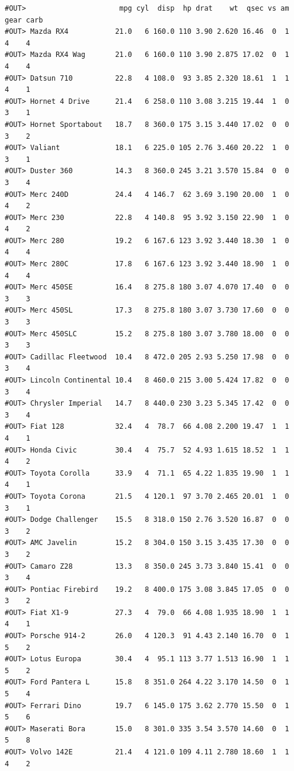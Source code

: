 \documentclass[]{book}
\begin{document}
\begin{verbatim}
#OUT>                      mpg cyl  disp  hp drat    wt  qsec vs am gear carb
#OUT> Mazda RX4           21.0   6 160.0 110 3.90 2.620 16.46  0  1    4    4
#OUT> Mazda RX4 Wag       21.0   6 160.0 110 3.90 2.875 17.02  0  1    4    4
#OUT> Datsun 710          22.8   4 108.0  93 3.85 2.320 18.61  1  1    4    1
#OUT> Hornet 4 Drive      21.4   6 258.0 110 3.08 3.215 19.44  1  0    3    1
#OUT> Hornet Sportabout   18.7   8 360.0 175 3.15 3.440 17.02  0  0    3    2
#OUT> Valiant             18.1   6 225.0 105 2.76 3.460 20.22  1  0    3    1
#OUT> Duster 360          14.3   8 360.0 245 3.21 3.570 15.84  0  0    3    4
#OUT> Merc 240D           24.4   4 146.7  62 3.69 3.190 20.00  1  0    4    2
#OUT> Merc 230            22.8   4 140.8  95 3.92 3.150 22.90  1  0    4    2
#OUT> Merc 280            19.2   6 167.6 123 3.92 3.440 18.30  1  0    4    4
#OUT> Merc 280C           17.8   6 167.6 123 3.92 3.440 18.90  1  0    4    4
#OUT> Merc 450SE          16.4   8 275.8 180 3.07 4.070 17.40  0  0    3    3
#OUT> Merc 450SL          17.3   8 275.8 180 3.07 3.730 17.60  0  0    3    3
#OUT> Merc 450SLC         15.2   8 275.8 180 3.07 3.780 18.00  0  0    3    3
#OUT> Cadillac Fleetwood  10.4   8 472.0 205 2.93 5.250 17.98  0  0    3    4
#OUT> Lincoln Continental 10.4   8 460.0 215 3.00 5.424 17.82  0  0    3    4
#OUT> Chrysler Imperial   14.7   8 440.0 230 3.23 5.345 17.42  0  0    3    4
#OUT> Fiat 128            32.4   4  78.7  66 4.08 2.200 19.47  1  1    4    1
#OUT> Honda Civic         30.4   4  75.7  52 4.93 1.615 18.52  1  1    4    2
#OUT> Toyota Corolla      33.9   4  71.1  65 4.22 1.835 19.90  1  1    4    1
#OUT> Toyota Corona       21.5   4 120.1  97 3.70 2.465 20.01  1  0    3    1
#OUT> Dodge Challenger    15.5   8 318.0 150 2.76 3.520 16.87  0  0    3    2
#OUT> AMC Javelin         15.2   8 304.0 150 3.15 3.435 17.30  0  0    3    2
#OUT> Camaro Z28          13.3   8 350.0 245 3.73 3.840 15.41  0  0    3    4
#OUT> Pontiac Firebird    19.2   8 400.0 175 3.08 3.845 17.05  0  0    3    2
#OUT> Fiat X1-9           27.3   4  79.0  66 4.08 1.935 18.90  1  1    4    1
#OUT> Porsche 914-2       26.0   4 120.3  91 4.43 2.140 16.70  0  1    5    2
#OUT> Lotus Europa        30.4   4  95.1 113 3.77 1.513 16.90  1  1    5    2
#OUT> Ford Pantera L      15.8   8 351.0 264 4.22 3.170 14.50  0  1    5    4
#OUT> Ferrari Dino        19.7   6 145.0 175 3.62 2.770 15.50  0  1    5    6
#OUT> Maserati Bora       15.0   8 301.0 335 3.54 3.570 14.60  0  1    5    8
#OUT> Volvo 142E          21.4   4 121.0 109 4.11 2.780 18.60  1  1    4    2
\end{verbatim}
\end{document}
